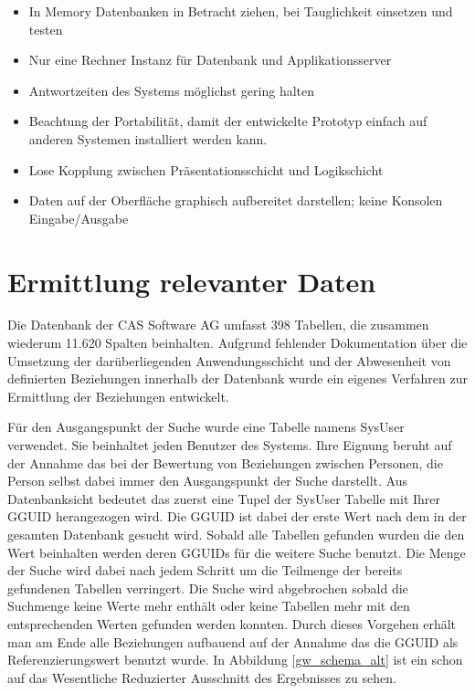 \begin{itemize}

	\item In Memory Datenbanken in Betracht ziehen, bei Tauglichkeit einsetzen und testen
	
	\item Nur eine Rechner Instanz für Datenbank und Applikationsserver 
	
	\item Antwortzeiten des Systems möglichst gering halten
	
	\item Beachtung der Portabilität, damit der entwickelte Prototyp einfach auf anderen Systemen installiert werden kann.
	
	\item Lose Kopplung zwischen Präsentationsschicht und Logikschicht
	
	\item Daten auf der Oberfläche graphisch aufbereitet darstellen; keine Konsolen Eingabe/Ausgabe

\end{itemize}

\section{Ermittlung relevanter Daten}
\label{ch:Systemanalyse:sec:Information}

Die Datenbank der CAS Software AG umfasst 398 Tabellen, die zusammen wiederum 11.620 Spalten beinhalten. Aufgrund fehlender Dokumentation über die Umsetzung der darüberliegenden Anwendungsschicht und der Abwesenheit von definierten Beziehungen innerhalb der Datenbank wurde ein eigenes Verfahren zur Ermittlung der Beziehungen entwickelt. 

Für den Ausgangspunkt der Suche wurde eine Tabelle namens SysUser verwendet. Sie beinhaltet jeden Benutzer des Systems. Ihre Eignung beruht auf der Annahme das bei der Bewertung von Beziehungen zwischen Personen, die Person selbst dabei immer den Ausgangspunkt der Suche darstellt. Aus Datenbanksicht bedeutet das zuerst eine Tupel der SysUser Tabelle mit Ihrer GGUID herangezogen wird. Die GGUID ist dabei der erste Wert nach dem in der gesamten Datenbank gesucht wird. Sobald alle Tabellen gefunden wurden die den Wert beinhalten werden deren GGUIDs für die weitere Suche benutzt. Die Menge der Suche wird dabei nach jedem Schritt um die Teilmenge der bereits gefundenen Tabellen verringert. Die Suche wird abgebrochen sobald die Suchmenge keine Werte mehr enthält oder keine Tabellen mehr mit den entsprechenden Werten gefunden werden konnten. Durch dieses Vorgehen erhält man am Ende alle Beziehungen aufbauend auf der Annahme das die GGUID als Referenzierungswert benutzt wurde. In Abbildung \ref{gw_schema_alt} ist ein schon auf das Wesentliche Reduzierter Ausschnitt des Ergebnisses zu sehen. 

